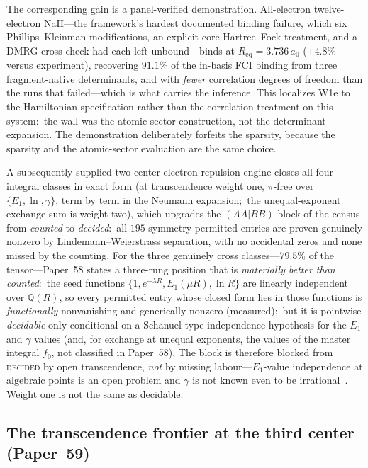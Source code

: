\documentclass[aps,pra,twocolumn,superscriptaddress,longbibliography]{revtex4-2}
\begin{document}
The corresponding gain is a panel-verified demonstration.  All-electron
twelve-electron NaH---the framework's hardest documented binding failure,
which six Phillips--Kleinman modifications, an explicit-core
Hartree--Fock treatment, and a DMRG cross-check had each left
unbound---binds at $R_{\mathrm{eq}} = 3.736\,a_0$ ($+4.8\%$ versus
experiment), recovering $91.1\%$ of the in-basis FCI binding from three
fragment-native determinants, and with \emph{fewer} correlation degrees
of freedom than the runs that failed---which is what carries the
inference.  This localizes W1e to the Hamiltonian specification rather
than the correlation treatment on this system:\ the wall was the atomic-sector
construction, not the determinant expansion.  The demonstration
deliberately forfeits the sparsity, because the sparsity and the
atomic-sector evaluation are the same choice.

A subsequently supplied two-center electron-repulsion engine closes all
four integral classes in exact form (at transcendence weight one,
$\pi$-free over $\{E_1, \ln, \gamma\}$, term by term in the Neumann expansion;\ the
unequal-exponent exchange sum is weight two), which upgrades the $(AA|BB)$
block of the census from \emph{counted} to \emph{decided}:\ all $195$
symmetry-permitted entries are proven genuinely nonzero by
Lindemann--Weierstrass separation, with no accidental zeros and none
missed by the counting.  For the three genuinely cross classes---$79.5\%$ of the tensor---Paper~58
states a three-rung position that is \emph{materially better than counted}:\
the seed functions $\{1, e^{-\lambda R}, E_1(\mu R), \ln R\}$ are linearly
independent over $\mathbb{Q}(R)$, so every permitted entry whose closed form lies in
those functions is \emph{functionally} nonvanishing and generically
nonzero (measured);\ but it is pointwise \emph{decidable} only conditional on
a Schanuel-type independence hypothesis for the $E_1$ and $\gamma$ values
(and, for exchange at unequal exponents, the values of the master integral
$f_0$, not classified in Paper~58).
The block is therefore blocked from \textsc{decided} by open transcendence,
\emph{not} by missing labour---$E_1$-value independence at algebraic points is
an open problem and $\gamma$ is not known even to be irrational~\cite{loutey_paper58}.
Weight one is not the same as decidable.

\subsection{The transcendence frontier at the third center (Paper~59)}
\end{document}
